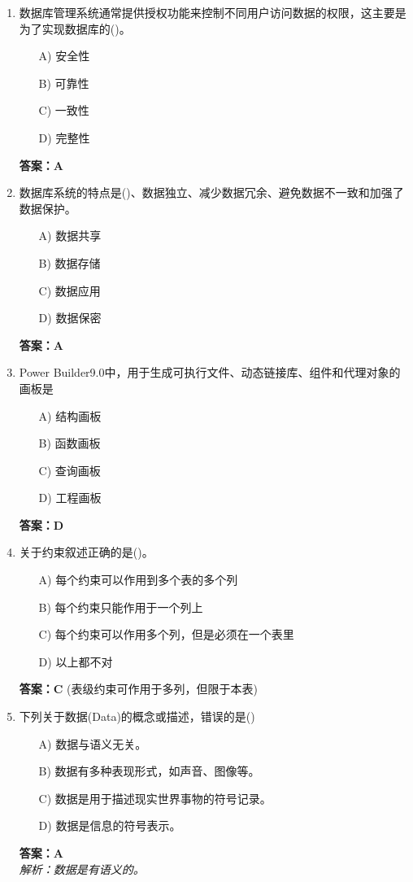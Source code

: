 \documentclass[a4paper,12pt]{article}
\begin{document}
\begin{enumerate}[label=\arabic*.]
\item 数据库管理系统通常提供授权功能来控制不同用户访问数据的权限，这主要是为了实现数据库的()。
\begin{itemize}
    \item[A)] 安全性
    \item[B)] 可靠性
    \item[C)] 一致性
    \item[D)] 完整性
\end{itemize}
\textbf{答案：A}

\item 数据库系统的特点是()、数据独立、减少数据冗余、避免数据不一致和加强了数据保护。
\begin{itemize}
    \item[A)] 数据共享
    \item[B)] 数据存储
    \item[C)] 数据应用
    \item[D)] 数据保密
\end{itemize}
\textbf{答案：A}

\item Power Builder9.0中，用于生成可执行文件、动态链接库、组件和代理对象的画板是
\begin{itemize}
    \item[A)] 结构画板
    \item[B)] 函数画板
    \item[C)] 查询画板
    \item[D)] 工程画板
\end{itemize}
\textbf{答案：D}

\item 关于约束叙述正确的是()。
\begin{itemize}
    \item[A)] 每个约束可以作用到多个表的多个列
    \item[B)] 每个约束只能作用于一个列上
    \item[C)] 每个约束可以作用多个列，但是必须在一个表里
    \item[D)] 以上都不对
\end{itemize}
\textbf{答案：C} (表级约束可作用于多列，但限于本表)

\item 下列关于数据(Data)的概念或描述，错误的是()
\begin{itemize}
    \item[A)] 数据与语义无关。
    \item[B)] 数据有多种表现形式，如声音、图像等。
    \item[C)] 数据是用于描述现实世界事物的符号记录。
    \item[D)] 数据是信息的符号表示。
\end{itemize}
\textbf{答案：A} \\
\textit{解析：数据是有语义的。}


\end{enumerate}
\end{document}

